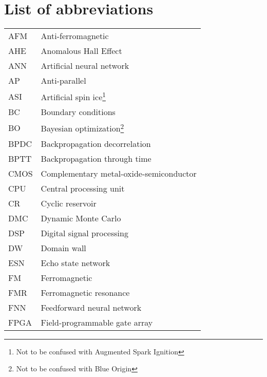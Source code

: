 \chapter{List of abbreviations}
{
    \addtolength{\skip\footins}{1pc}
    \begin{longtable}[l]{ll}
        AFM   & Anti-ferromagnetic                          \\
        AHE   & Anomalous Hall Effect                       \\
        ANN   & Artificial neural network                   \\
        AP    & Anti-parallel                               \\
        ASI   & Artificial spin ice\footnote{Not to be confused with Augmented Spark Ignition} \\
        BC    & Boundary conditions                         \\
        BO    & Bayesian optimization\footnote{Not to be confused with Blue Origin} \\
        BPDC  & Backpropagation decorrelation               \\
        BPTT  & Backpropagation through time                \\
        CMOS  & Complementary metal-oxide-semiconductor     \\
        CPU   & Central processing unit                     \\
        CR    & Cyclic reservoir                            \\
        DMC   & Dynamic Monte Carlo                         \\
        DSP   & Digital signal processing                   \\
        DW    & Domain wall                                 \\
        ESN   & Echo state network                          \\
        FM    & Ferromagnetic                               \\
        FMR   & Ferromagnetic resonance                     \\ %
        FNN   & Feedforward neural network                  \\
        FPGA  & Field-programmable gate array               \\

\end{longtable}}
